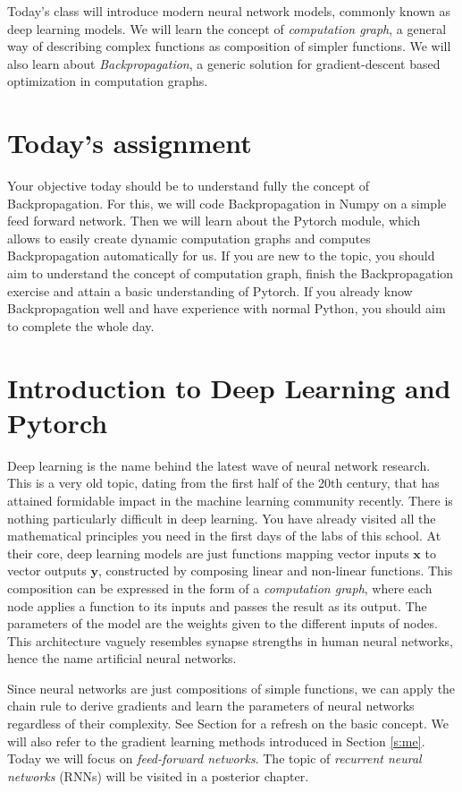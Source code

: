 Today's class will introduce modern neural network models, commonly known as
deep learning models. We will learn the concept of \textit{computation graph},
a general way of describing complex functions as composition of simpler
functions. We will also learn about \textit{Backpropagation}, a generic
solution for gradient-descent based optimization in computation graphs.


\section{Today's assignment}

Your objective today should be to understand fully the concept of
Backpropagation. For this, we will code Backpropagation in Numpy on a simple
feed forward network. Then we will learn about the Pytorch module, which allows
to easily create dynamic computation graphs and computes Backpropagation
automatically for us. If you are new to the topic, you should aim to understand
the concept of computation graph, finish the Backpropagation exercise and
attain a basic understanding of Pytorch. If you already know Backpropagation
well and have experience with normal Python, you should aim to complete the
whole day.

\section{Introduction to Deep Learning and Pytorch}

Deep learning is the name behind the latest wave of neural network research.
This is a very old topic, dating from the first half of the 20th century, that
has attained formidable impact in the machine learning community recently.
There is nothing particularly difficult in deep learning. You have already
visited all the mathematical principles you need in the first days of the labs
of this school. At their core, deep learning models are just functions mapping
vector inputs $\mathbf{x}$ to vector outputs $\mathbf{y}$, constructed by
composing linear and non-linear functions. This composition can be expressed in
the form of a \textit{computation graph}, where each node applies a function to
its inputs and passes the result as its output. The parameters of the model are
the weights given to the different inputs of nodes. This architecture vaguely
resembles synapse strengths in human neural networks, hence the name artificial
neural networks.

Since neural networks are just compositions of simple functions, we can apply
the chain rule to derive gradients and learn the parameters of neural networks
regardless of their complexity.
See Section \label{gradient_methods} for a refresh on the basic concept. We
will also refer to the gradient learning methods introduced in Section
\ref{s:me}. Today we will focus on \textit{feed-forward networks}. The topic of
\textit{recurrent neural networks} (RNNs) will be visited in a posterior
chapter.

